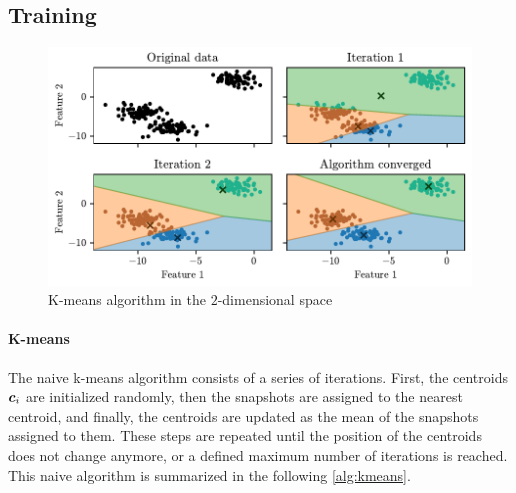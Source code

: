 \subsection{Training}

\begin{figure}[htbp]
  \centering
  \includegraphics[width=\textwidth]{images/Kmeans_vornoi.pdf}
  \caption{K-means algorithm in the $2$-dimensional space}
  \label{fig:kmeans_vornoi}
\end{figure}

\paragraph*{K-means} The naive k-means algorithm consists of a series of iterations. First, the centroids $\bm{c}_i$ are initialized randomly, then the snapshots are assigned to the nearest centroid, and finally, the centroids are updated as the mean of the snapshots assigned to them. These steps are repeated until the position of the centroids does not change anymore, or a defined maximum number of iterations is reached. This naive algorithm is summarized in the following \autoref{alg:kmeans}.

